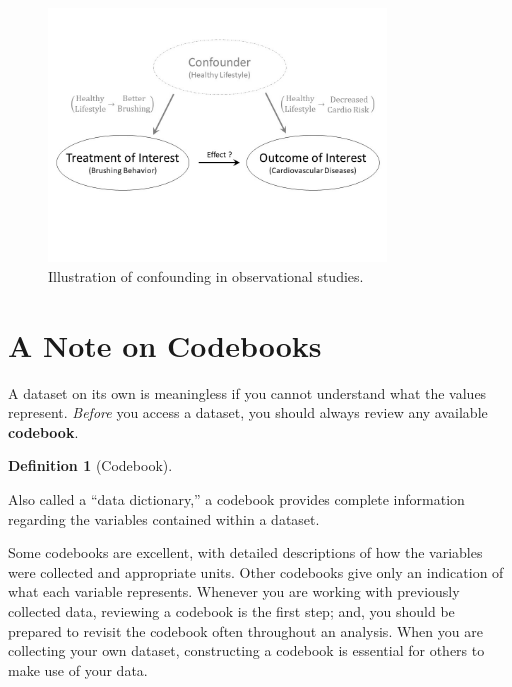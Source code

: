 \documentclass[
  letterpaper,
  DIV=11,
  numbers=noendperiod]{scrreprt}
\theoremstyle{definition}
\newtheorem{definition}{Definition}[chapter]
\theoremstyle{definition}
\theoremstyle{remark}
\begin{document}
\begin{figure}

{\centering \includegraphics[width=0.8\textwidth,height=\textheight]{images/Statistical-Process-Confounding.jpg}

}

\caption{\label{fig-statistical-process-confounding}Illustration of
confounding in observational studies.}

\end{figure}

\hypertarget{a-note-on-codebooks}{%
\section{A Note on Codebooks}\label{a-note-on-codebooks}}

A dataset on its own is meaningless if you cannot understand what the
values represent. \emph{Before} you access a dataset, you should always
review any available \textbf{codebook}.

\begin{definition}[Codebook]\protect\hypertarget{def-codebook}{}\label{def-codebook}

Also called a ``data dictionary,'' a codebook provides complete
information regarding the variables contained within a dataset.

\end{definition}

Some codebooks are excellent, with detailed descriptions of how the
variables were collected and appropriate units. Other codebooks give
only an indication of what each variable represents. Whenever you are
working with previously collected data, reviewing a codebook is the
first step; and, you should be prepared to revisit the codebook often
throughout an analysis. When you are collecting your own dataset,
constructing a codebook is essential for others to make use of your
data.
\end{document}
